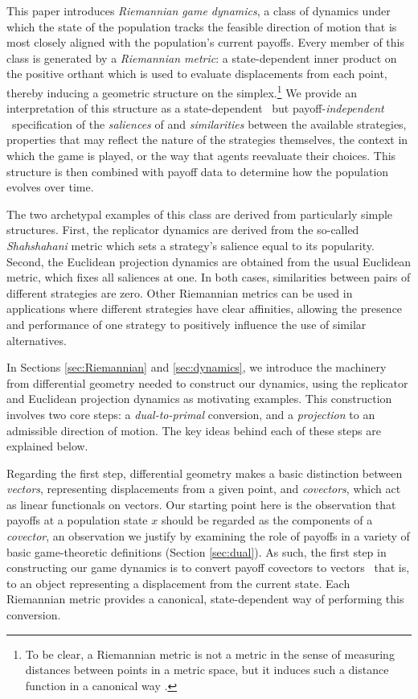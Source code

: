\documentclass[reqno]{amsart}
\theoremstyle{plain}
\theoremstyle{definition}
\theoremstyle{remark}
\numberwithin{equation}{section}
\numberwithin{theorem}{section}
\begin{document}
This paper introduces \emph{Riemannian game dynamics}, a class of dynamics under which the state of the population tracks the feasible direction of motion that is most closely aligned with the population's current payoffs.
Every member of this class is generated by a \emph{Riemannian metric}: a state-dependent inner product on the positive orthant which is used to evaluate displacements from each point, thereby inducing a geometric structure on the simplex.\footnote{To be clear, a Riemannian metric is not a metric in the sense of measuring distances between points in a metric space, but it induces such a distance function in a canonical way \citep{Lee97}.}
We provide an interpretation of this structure as a state-dependent \textendash\ but payoff-\emph{independent} \textendash\ specification of the \emph{saliences} of and \emph{similarities} between the available strategies, properties that may reflect the nature of the strategies themselves, the context in which the game is played, or the way that agents reevaluate their choices.
This structure is then combined with payoff data to determine how the population evolves over time.

The two archetypal examples of this class are derived from particularly simple structures.
First, the replicator dynamics \citep{TJ78} are derived from the so-called \emph{Shahshahani} metric \citep{Sha79} which sets a strategy's salience equal to its popularity.
Second, the Euclidean projection dynamics \citep{NZ97} are obtained from the usual Euclidean metric, which fixes all saliences at one.
In both cases, similarities between pairs of different strategies are zero.
Other Riemannian metrics can be used in applications where different strategies have clear affinities, allowing the presence and performance of one strategy to positively influence the use of similar alternatives.

In Sections \ref{sec:Riemannian} and \ref{sec:dynamics}, we introduce the machinery from differential geometry needed to construct our dynamics, using the replicator and Euclidean projection dynamics as motivating examples.
This construction involves two core steps:
a \emph{dual-to-primal} conversion, and a \emph{projection} to an admissible direction of motion.
The key ideas behind each of these steps are explained below.

Regarding the first step, differential geometry makes a basic distinction between \emph{vectors}, representing displacements from a given point, and \emph{covectors}, which act as linear functionals on vectors.
Our starting point here is the observation that payoffs at a population state $x$ should be regarded as the components of a \emph{covector}, an observation we justify by examining the role of payoffs in a variety of basic game-theoretic definitions (Section \ref{sec:dual}).
As such, the first step in constructing our game dynamics is to convert payoff covectors to vectors \textendash\ that is, to an object representing a displacement from the current state.
Each Riemannian metric provides a canonical, state-dependent way of performing this conversion.
\end{document}
